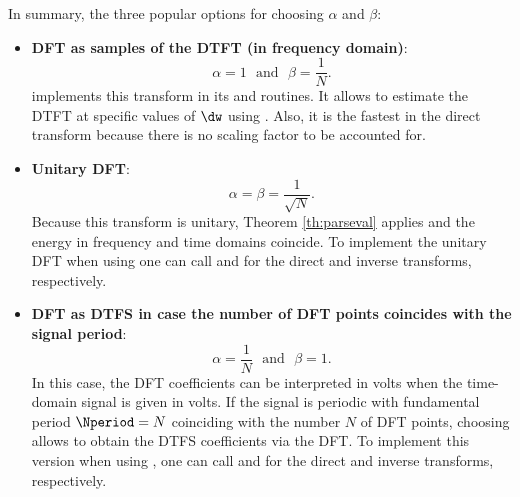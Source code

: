 In summary, the three popular options for choosing $\alpha$ and $\beta$:
\begin{itemize}
        \item \textbf{DFT as samples of the DTFT (in frequency domain)}: 
\begin{equation}
\alpha=1 \textrm{~~and~~} \beta=\frac{1}{N}. 
\label{eq:dft_as_sampled_dtft}
\end{equation}								
				{\matlab} implements this transform in its  and  routines. It allows to estimate the DTFT at specific values of $\dw$ using . Also, it is the fastest in the direct transform because there is no scaling factor to be accounted for.
        \item \textbf{Unitary DFT}: 
\begin{equation}
\alpha = \beta=\frac{1}{\sqrt{N}}. 
\label{eq:dft_as_unitary}
\end{equation}								
Because this transform is unitary, Theorem \ref{th:parseval} applies and the energy  in frequency and time  domains coincide. To implement the unitary DFT when using {\matlab} one can call  and  for the direct and inverse transforms, respectively. 
        \item \textbf{DFT as DTFS in case the number of DFT points coincides with the signal period}:
\begin{equation}
\alpha=\frac{1}{N} \textrm{~~and~~} \beta=1. 
\label{eq:dft_as_dtfs}
\end{equation}				
In this case, the DFT coefficients can be interpreted in volts when the time-domain signal is given in volts. If the signal is periodic with fundamental period $\Nperiod = N$ coinciding with the number $N$ of DFT points, choosing  allows to obtain the DTFS coefficients via the DFT. To implement this version when using {\matlab}, one can call  and  for the direct and inverse transforms, respectively. 
\end{itemize}



